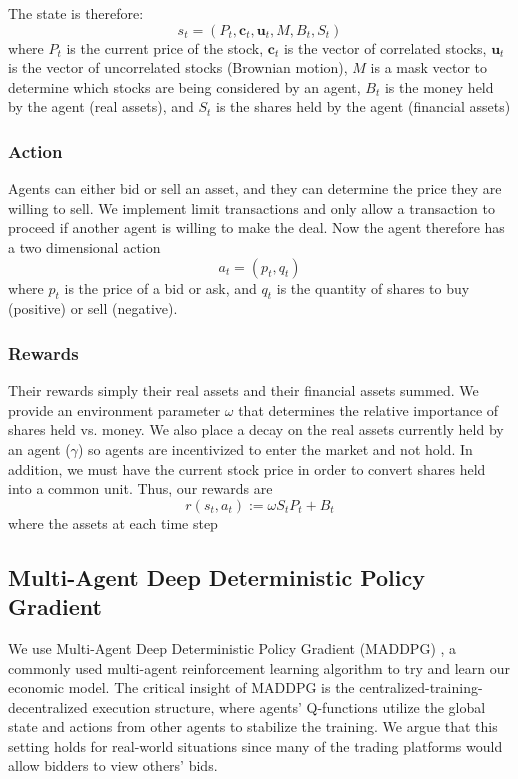 \documentclass{article}
\begin{document}
The state is therefore:
\begin{equation}
    s_t = (P_t, \mathbf{c}_t, \mathbf{u}_t, M, B_t, S_t)
\end{equation}
where $P_t$ is the current price of the stock, $\mathbf{c}_t$ is the vector of correlated stocks, $\mathbf{u}_t$ is the vector of uncorrelated stocks (Brownian motion), $M$ is a mask vector to determine which stocks are being considered by an agent, $B_t$ is the money held by the agent (real assets), and $S_t$ is the shares held by the agent (financial assets)

\subsubsection{Action}
Agents can either bid or sell an asset, and they can determine the price they are willing to sell. We implement limit transactions and only allow a transaction to proceed if another agent is willing to make the deal. Now the agent therefore has a two dimensional action
\begin{equation}
    a_t = (p_t, q_t)
\end{equation}
where $p_t$ is the price of a bid or ask, and $q_t$ is the quantity of shares to buy (positive) or sell (negative). 

\subsubsection{Rewards}

Their rewards simply their real assets and their financial assets summed. We provide an environment parameter $\omega$ that determines the relative importance of shares held vs. money. We also place a decay on the real assets currently held by an agent ($\gamma$) so agents are incentivized to enter the market and not hold. In addition, we must have the current stock price in order to convert shares held into a common unit. Thus, our rewards are 
\begin{equation}
    r(s_t, a_t) := \omega S_tP_t + B_t
\end{equation}
where the assets at each time step

\subsection{Multi-Agent Deep Deterministic Policy Gradient}
We use Multi-Agent Deep Deterministic Policy Gradient (MADDPG) \citep{lowe2017maddpg}, a commonly used multi-agent reinforcement learning algorithm to try and learn our economic model. The critical insight of MADDPG is the centralized-training-decentralized execution structure, where agents' Q-functions utilize the global state and actions from other agents to stabilize the training. We argue that this setting holds for real-world situations since many of the trading platforms would allow bidders to view others' bids.
\end{document}

